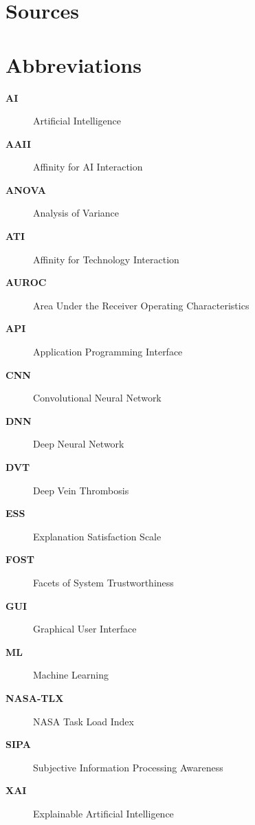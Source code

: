 {}
\listoffigures
\clearpage

{}
\listoftables
\clearpage

{}
\renewcommand*{\listlistingname}{List of Source Codes}
\listoflistings
\clearpage

{}
\chapter*{Sources}

\printbibliography[heading=subbibintoc, nottype=online, nottype=software]

\printbibliography[heading=subbibintoc, type=online, title=Websites]

\printbibliography[heading=subbibintoc, type=software, title=Software]
\clearpage

{}
\chapter*{Abbreviations}
\begin{description}
    \item [\textbf{AI}] Artificial Intelligence
    \item [\textbf{AAII}] Affinity for AI Interaction
    \item [\textbf{ANOVA}] Analysis of Variance
    \item [\textbf{ATI}] Affinity for Technology Interaction
    \item [\textbf{AUROC}] Area Under the Receiver Operating Characteristics
    \item [\textbf{API}] Application Programming Interface
    \item [\textbf{CNN}] Convolutional Neural Network
    \item [\textbf{DNN}] Deep Neural Network
    \item [\textbf{DVT}] Deep Vein Thrombosis
    \item [\textbf{ESS}] Explanation Satisfaction Scale
    \item [\textbf{FOST}] Facets of System Trustworthiness
    \item [\textbf{GUI}] Graphical User Interface
    \item [\textbf{ML}] Machine Learning
    \item [\textbf{NASA-TLX}] NASA Task Load Index
    \item [\textbf{SIPA}] Subjective Information Processing Awareness
    \item [\textbf{XAI}] Explainable Artificial Intelligence
\end{description}
\clearpage

